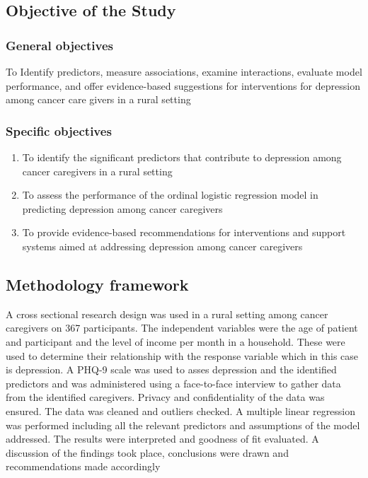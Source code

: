 \documentclass[12pt]{article}
\numberwithin{equation}{section}
\begin{document}
\subsection{Objective of the Study}
\subsubsection{General objectives}
To Identify predictors, measure associations, examine interactions, evaluate model performance, and offer evidence-based suggestions for interventions for depression among cancer care givers in a rural setting
\subsubsection{Specific objectives}
\begin{enumerate}
\item To identify the significant predictors that contribute to depression among cancer caregivers in a rural setting
\item To assess the performance of the ordinal logistic regression model in predicting depression among cancer caregivers
\item To provide evidence-based recommendations for interventions and support systems aimed at addressing depression among cancer caregivers
\end{enumerate}

\subsection{Methodology framework}
A cross sectional research design was used in a rural setting among cancer caregivers on 367 participants. The independent variables were the age of patient and participant and the level of income per month in a household. These were used to determine their relationship with the response variable which in this case is depression. A PHQ-9 scale was used to asses depression and the identified predictors and was administered using a face-to-face interview to gather data from the identified caregivers. Privacy and confidentiality of the data was ensured. The data was cleaned and outliers checked. A multiple linear regression was performed including all the relevant predictors and assumptions of the model addressed. The results were interpreted and goodness of fit evaluated. A discussion of the findings took place, conclusions were drawn and recommendations made accordingly
\end{document}
